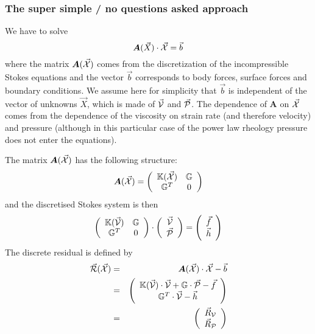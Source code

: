\subsubsection*{The super simple / no questions asked approach}

We have to solve 
\[
{\bm A}(\vec{X}) \cdot \vec{\cal X} = \vec{b}
\]
where the matrix ${\bm A}(\vec{\cal X})$ comes from the discretization of the incompressible
Stokes equations and the vector $\vec{b}$ corresponds to body forces, surface forces and 
boundary conditions. We assume here for simplicity that $\vec{b}$
is independent of the vector of unknowns $\vec{X}$, which is made of
$\vec{\cal V}$ and $\vec{\cal P}$. The dependence of ${\bm A}$ on $\vec{\cal X}$ 
comes from the dependence of the viscosity on strain rate (and therefore velocity)
and pressure (although in this particular case of the power law rheology pressure does 
not enter the equations). 

The matrix ${\bm A}(\vec{\cal X})$ has the following structure:
\begin{equation}
{\bm A}(\vec{\cal X}) = 
\left(
\begin{array}{cc}
{\mathbb{K}}(\vec{\cal X}) & {\mathbb{G}}  \\
{\mathbb{G}}^T & 0 
\end{array}
\right)
\end{equation} 
and the discretised Stokes system is then
\begin{equation}
\left(
\begin{array}{cc}
{\mathbb{K}}(\vec{\cal V}) & {\mathbb{G}}  \\
{\mathbb{G}}^T & 0 
\end{array}
\right)
\cdot
\left(
\begin{array}{cc}
\vec{\cal V} \\
\vec{\cal P} \\
\end{array}
\right)
=
\left(
\begin{array}{cc}
\vec{f} \\ \vec{h}
\end{array}
\right)
\end{equation}
The discrete residual is defined by 
\begin{eqnarray}
\vec{\cal R}(\vec{\cal X}) 
&=& {\bm A}(\vec{\cal X})\cdot \vec{\cal X} - \vec{b} \label{eq:f87_res} \\
&=& 
\left(
\begin{array}{c}
{\mathbb{K}}(\vec{\cal V}) \cdot \vec{\cal V} + {\mathbb{G}} \cdot \vec{\cal P} - \vec{f} \\
{\mathbb{G}}^T \cdot \vec{\cal V} - \vec{h}
\end{array}
\right) \\
&=&
\left(
\begin{array}{cc}
\vec{R}_{\cal V} \\
\vec{R}_{\cal P} 
\end{array}
\right)
\end{eqnarray}



